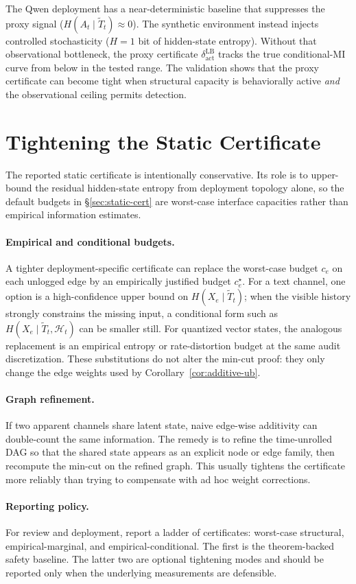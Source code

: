 \documentclass{article}
\begin{document}
The Qwen deployment has a near-deterministic baseline that suppresses the proxy signal ($H(A_t \mid \tilde T_t) \approx 0$). The synthetic environment instead injects controlled stochasticity ($H = 1$ bit of hidden-state entropy). Without that observational bottleneck, the proxy certificate $\delta_\text{act}^\text{LB}$ tracks the true conditional-MI curve from below in the tested range. The validation shows that the proxy certificate can become tight when structural capacity is behaviorally active \emph{and} the observational ceiling permits detection.

\section{Tightening the Static Certificate}
\label{app:static-tightening}

The reported static certificate is intentionally conservative. Its role is to upper-bound the residual hidden-state entropy from deployment topology alone, so the default budgets in \S\ref{sec:static-cert} are worst-case interface capacities rather than empirical information estimates.

\paragraph{Empirical and conditional budgets.}
A tighter deployment-specific certificate can replace the worst-case budget $c_e$ on each unlogged edge by an empirically justified budget $c_e^\star$. For a text channel, one option is a high-confidence upper bound on $H(X_e \mid \tilde T_t)$; when the visible history strongly constrains the missing input, a conditional form such as $H(X_e \mid \tilde T_t, \mathcal H_t)$ can be smaller still. For quantized vector states, the analogous replacement is an empirical entropy or rate-distortion budget at the same audit discretization. These substitutions do not alter the min-cut proof: they only change the edge weights used by Corollary~\ref{cor:additive-ub}.

\paragraph{Graph refinement.}
If two apparent channels share latent state, naive edge-wise additivity can double-count the same information. The remedy is to refine the time-unrolled DAG so that the shared state appears as an explicit node or edge family, then recompute the min-cut on the refined graph. This usually tightens the certificate more reliably than trying to compensate with ad hoc weight corrections.

\paragraph{Reporting policy.}
For review and deployment, report a ladder of certificates: worst-case structural, empirical-marginal, and empirical-conditional. The first is the theorem-backed safety baseline. The latter two are optional tightening modes and should be reported only when the underlying measurements are defensible.
\end{document}
